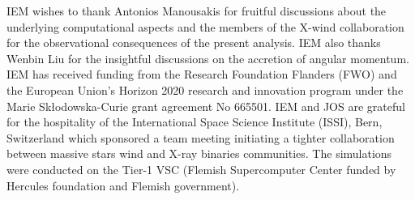 \documentclass{aa}
\begin{document}
%
%
%


\begin{acknowledgements}
IEM wishes to thank Antonios Manousakis for fruitful discussions about the underlying computational aspects and the members of the X-wind collaboration for the observational consequences of the present analysis. IEM also thanks Wenbin Liu for the insightful discussions on the accretion of angular momentum. IEM has received funding from the Research Foundation Flanders (FWO) and the European Union's Horizon 2020 research and innovation program under the Marie Sk\l odowska-Curie grant agreement No 665501. IEM and JOS are grateful for the hospitality of the International Space Science Institute (ISSI), Bern, Switzerland which sponsored a team meeting initiating a tighter collaboration between massive stars wind and X-ray binaries communities. The simulations were conducted on the Tier-1 VSC (Flemish Supercomputer Center funded by Hercules foundation and Flemish government).
\end{acknowledgements}




\begin{tiny}

\end{tiny}
\end{document}
